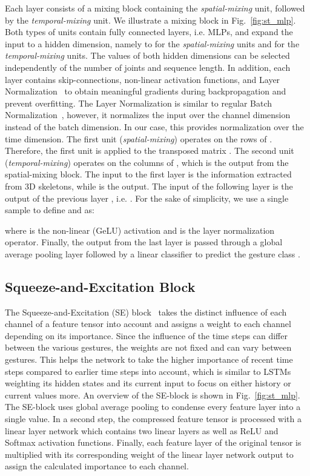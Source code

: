 \documentclass[letterpaper, 10 pt, conference]{ieeeconf}
\begin{document}
Each layer  consists of a mixing block containing the \textit{spatial-mixing} unit, followed by the \textit{temporal-mixing} unit. We illustrate a mixing block in Fig.~\ref{fig:st_mlp}. Both types of units contain fully connected layers, i.e. MLPs, and expand the input to a hidden dimension, namely to  for the \textit{spatial-mixing} units and  for the \textit{temporal-mixing} units. The values of both hidden dimensions can be selected independently of the number of joints and sequence length. In addition, each layer contains skip-connections, non-linear activation functions, and Layer Normalization~\cite{ba2016layer} to obtain meaningful gradients during backpropagation and prevent overfitting. The Layer Normalization is similar to regular Batch Normalization~\cite{pmlr-v37-ioffe15}, however, it normalizes the input over the channel dimension instead of the batch dimension. In our case, this provides normalization over the time dimension. The first unit (\textit{spatial-mixing}) operates on the rows of . Therefore, the first unit is applied to the transposed matrix . The second unit (\textit{temporal-mixing}) operates on the columns of , which is the output from the spatial-mixing block. The input to the first layer is the information  extracted from 3D skeletons, while  is the output. The input  of the following layer  is the output  of the previous layer , i.e. . For the sake of simplicity, we use a single sample to define  and  as:



where  is the non-linear (GeLU) activation and  is the layer normalization operator. Finally, the output from the last layer is passed through a global average pooling layer followed by a linear classifier to predict the gesture class .


\subsection{Squeeze-and-Excitation Block}
\label{subsec:se_model}

The Squeeze-and-Excitation (SE) block~\cite{Hu_2018_CVPR} takes the distinct influence of each channel of a feature tensor into account and assigns a weight to each channel depending on its importance. Since the influence of the time steps can differ between the various gestures, the weights are not fixed and can vary between gestures. This helps the network to take the higher importance of recent time steps compared to earlier time steps into account, which is similar to LSTMs weighting its hidden states and its current input to focus on either history or current values more. An overview of the SE-block is shown in Fig.~\ref{fig:st_mlp}. The SE-block uses global average pooling to condense every feature layer into a single value. In a second step, the compressed feature tensor is processed with a linear layer network which contains two linear layers as well as ReLU and Softmax activation functions. Finally, each feature layer of the original tensor is multiplied with its corresponding weight of the linear layer network output to assign the calculated importance to each channel.
\end{document}
